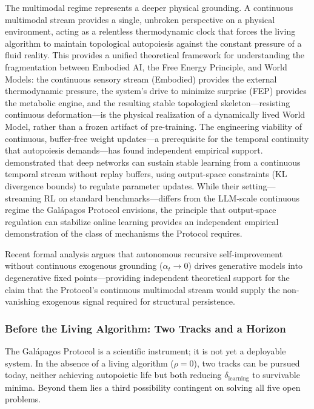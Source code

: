 \documentclass{article}
\begin{document}
The multimodal regime represents a deeper physical grounding. A continuous multimodal stream provides a single, unbroken perspective on a physical environment, acting as a relentless thermodynamic clock that forces the living algorithm to maintain topological autopoiesis against the constant pressure of a fluid reality. This provides a unified theoretical framework for understanding the fragmentation between Embodied AI, the Free Energy Principle, and World Models: the continuous sensory stream (Embodied) provides the external thermodynamic pressure, the system's drive to minimize surprise (FEP) provides the metabolic engine, and the resulting stable topological skeleton---resisting continuous deformation---is the physical realization of a dynamically lived World Model, rather than a frozen artifact of pre-training. The engineering viability of continuous, buffer-free weight updates---a prerequisite for the temporal continuity that autopoiesis demands---has found independent empirical support. \citet{Sharifnassab2026intentional} demonstrated that deep networks can sustain stable learning from a continuous temporal stream without replay buffers, using output-space constraints (KL divergence bounds) to regulate parameter updates. While their setting---streaming RL on standard benchmarks---differs from the LLM-scale continuous regime the Gal\'apagos Protocol envisions, the principle that output-space regulation can stabilize online learning provides an independent empirical demonstration of the class of mechanisms the Protocol requires.

Recent formal analysis \citep{Zenil2026limits} argues that autonomous recursive self-improvement without continuous exogenous grounding ($\alpha_t \to 0$) drives generative models into degenerative fixed points---providing independent theoretical support for the claim that the Protocol's continuous multimodal stream would supply the non-vanishing exogenous signal required for structural persistence.

\subsubsection{Before the Living Algorithm: Two Tracks and a Horizon}

The Galápagos Protocol is a scientific instrument; it is not yet a deployable system. In the absence of a living algorithm ($\rho = 0$), two tracks can be pursued today, neither achieving autopoietic life but both reducing $\delta_{\text{learning}}$ to survivable minima. Beyond them lies a third possibility contingent on solving all five open problems.
\end{document}
